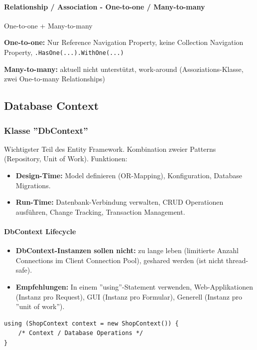 \documentclass[
a4paper,
oneside,
10pt,
fleqn,
headsepline,
toc=listofnumbered, 
bibliography=totocnumbered]{scrartcl}
\begin{document}
\paragraph{Relationship / Association - One-to-one / Many-to-many} One-to-one + Many-to-many

\textbf{One-to-one:} Nur Reference Navigation Property, keine Collection Navigation Property, \lstinline|.HasOne(...).WithOne(...)|

\textbf{Many-to-many:} aktuell nicht unterstützt, work-around (Assoziations-Klasse, zwei One-to-many Relationships)

\subsection{Database Context}
\subsubsection{Klasse ''DbContext''}
Wichtigster Teil des Entity Framework. Kombination zweier Patterns (Repository, Unit of Work). Funktionen:
\begin{itemize}
    \item \textbf{Design-Time:} Model definieren (OR-Mapping), Konfiguration, Database Migrations.
    \item \textbf{Run-Time:} Datenbank-Verbindung verwalten, CRUD Operationen ausführen, Change Tracking, Transaction Management.
\end{itemize}

\paragraph{DbContext Lifecycle}
\begin{itemize}
    \item \textbf{DbContext-Instanzen sollen nicht:} zu lange leben (limitierte Anzahl Connections im Client Connection Pool), geshared werden (ist nicht thread-safe).
     \item \textbf{Empfehlungen:} In einem ''using''-Statement verwenden, Web-Applikationen (Instanz pro Request), GUI (Instanz pro Formular), Generell (Instanz pro ''unit of work'').
\end{itemize}

\begin{lstlisting}
using (ShopContext context = new ShopContext()) {
    /* Context / Database Operations */
}
\end{lstlisting}
\end{document}
